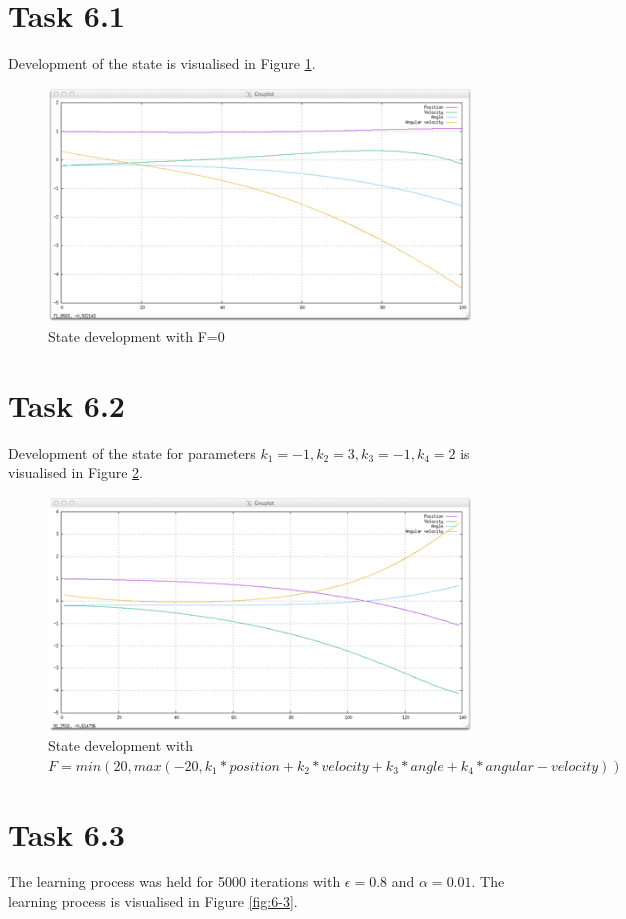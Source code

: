 \documentclass[english]{scrartcl}
\begin{document}
\section*{Task 6.1}
Development of the state is visualised in Figure \ref{fig:6-1}.

\begin{figure}[h]
\centering
\includegraphics{./6-1}
\caption{State development with F=0}
\label{fig:6-1}
\end{figure}

\section*{Task 6.2}
Development of the state for parameters $k_{1} = -1, k_{2} = 3, k_{3} = -1, k_{4} = 2$ is visualised in Figure \ref{fig:6-2}.

\begin{figure}[h]
\centering
\includegraphics{./6-2}
\caption{State development with $F=min(20,max(-20,k_{1}*position+k_{2}*velocity+k_{3}*angle+k_{4}*angular-velocity))$}
\label{fig:6-2}
\end{figure}

\section*{Task 6.3}
The learning process was held for 5000 iterations with $\epsilon=0.8$ and $\alpha=0.01$. The learning process is visualised in Figure \ref{fig:6-3}.
\end{document}
